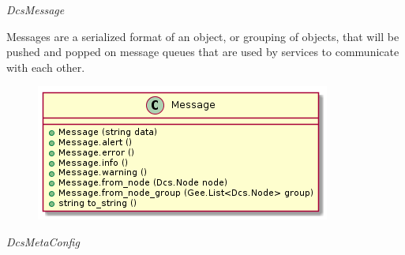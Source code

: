       \emph{DcsMessage}

      \vspace*{-0.75cm}
      \begin{minipage}[t]{0.5\textwidth}
        \vspace*{0.5cm}
        Messages are a serialized format of an object, or grouping of objects,
        that will be pushed and popped on message queues that are used by
        services to communicate with each other.
      \end{minipage} \hfill
      \begin{minipage}[t]{0.45\textwidth}
        \begin{figure}[H]
          \includegraphics[width=\textwidth]{figures/design/class/core/message}
          \label{fig:dsg-classes-message}
        \end{figure}
      \end{minipage}

      \emph{DcsMetaConfig}


